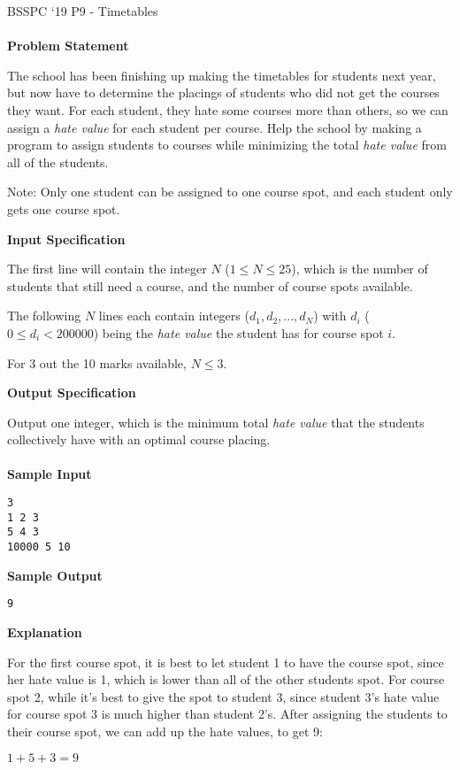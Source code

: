 \documentclass[]{article}
\begin{document}
{\Large BSSPC ‘19 P9 - Timetables}
\\\\
\textbf{\large Problem Statement}
\par
The school has been finishing up making the timetables for students next year, but now have to determine the placings of students who did not get the courses they want. For each student, they hate some courses more than others, so we can assign a \textit{hate value} for each student per course. Help the school by making a program to assign students to courses while minimizing the total \textit{hate value} from all of the students.

\par
Note: Only one student can be assigned to one course spot, and each student only gets one course spot.

\textbf{\large Input Specification}
\par
The first line will contain the integer $N$ ($1 \le N \le 25$), which is the number of students that still need a course, and the number of course spots available.

\par
The following $N$ lines each contain integers ($d_1, d_2, ..., d_N$) with $d_i$ ($0 \le d_i < 200000$) being the \textit{hate value} the student has for course spot $i$.

\par
For 3 out the 10 marks available, $N \le 3$.

\textbf{\large Output Specification}
\par
Output one integer, which is the minimum total \textit{hate value} that the students collectively have with an optimal course placing.
\\\\
\textbf{\large Sample Input}
\begin{verbatim}
3
1 2 3
5 4 3
10000 5 10
\end{verbatim}
\textbf{\large Sample Output}
\begin{verbatim}
9
\end{verbatim}
\textbf{\large Explanation}
\par
For the first course spot, it is best to let student 1 to have the course spot, since her hate value is 1, which is lower than all of the other students spot. For course spot 2, while it’s best to give the spot to student 3, since student 3’s hate value for course spot 3 is much higher than student 2’s. After assigning the students to their course spot, we can add up the hate values, to get 9:

\par
$1 + 5 + 3 = 9$
\end{document}
